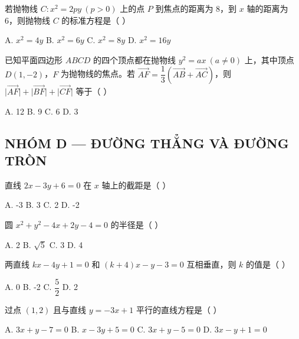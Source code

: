\documentclass[11pt, a4paper]{article}
\begin{document}
\begin{baitap}[18]
若抛物线 $C: x^2 = 2py\ (p>0)$ 上的点 $P$ 到焦点的距离为 8，到 $x$ 轴的距离为 6，则抛物线 $C$ 的标准方程是（ ）
\par\vspace{3pt}
\noindent A. $x^2 = 4y$ \quad B. $x^2 = 6y$ \quad C. $x^2 = 8y$ \quad D. $x^2 = 16y$
\end{baitap}

\begin{baitap}[19]
已知平面四边形 $ABCD$ 的四个顶点都在抛物线 $y^2 = ax\ (a \neq 0)$ 上，其中顶点 $D(1,-2)$，$F$ 为抛物线的焦点。若 $\overrightarrow{AF} = \dfrac{1}{3}(\overrightarrow{AB} + \overrightarrow{AC})$，则 $\lvert\overrightarrow{AF}\rvert + \lvert\overrightarrow{BF}\rvert + \lvert\overrightarrow{CF}\rvert$ 等于（ ）
\par\vspace{3pt}
\noindent A. 12 \quad B. 9 \quad C. 6 \quad D. 3
\end{baitap}

\subsection*{NHÓM D — ĐƯỜNG THẲNG VÀ ĐƯỜNG TRÒN}

\begin{baitap}[20]
直线 $2x - 3y + 6 = 0$ 在 $x$ 轴上的截距是（ ）
\par\vspace{3pt}
\noindent A. -3 \quad B. 3 \quad C. 2 \quad D. -2
\end{baitap}

\begin{baitap}[21]
圆 $x^2 + y^2 - 4x + 2y - 4 = 0$ 的半径是（ ）
\par\vspace{3pt}
\noindent A. 2 \quad B. $\sqrt{5}$ \quad C. 3 \quad D. 4
\end{baitap}

\begin{baitap}[22]
两直线 $kx - 4y + 1 = 0$ 和 $(k + 4)x - y - 3 = 0$ 互相垂直，则 $k$ 的值是（ ）
\par\vspace{3pt}
\noindent A. 0 \quad B. -2 \quad C. $\dfrac{5}{2}$ \quad D. 2
\end{baitap}

\begin{baitap}[23]
过点 $(1,2)$ 且与直线 $y = -3x + 1$ 平行的直线方程是（ ）
\par\vspace{3pt}
\noindent A. $3x + y - 7 = 0$ \quad B. $x - 3y + 5 = 0$ \quad C. $3x + y - 5 = 0$ \quad D. $3x - y + 1 = 0$
\end{baitap}
\end{document}
